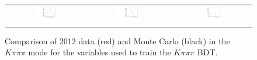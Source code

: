 \begin{figure}
\begin{tabular}{ccc}
\includegraphics[width=0.3\textwidth]{ANA_resources/Plots/Monte_carlo/data_vs_MC/Kpipipi/log10(KstarPi_IPCHI2_OWNPV)_2012.pdf} & \includegraphics[width=0.3\textwidth]{ANA_resources/Plots/Monte_carlo/data_vs_MC/Kpipipi/log10(KstarK_PT)_2012.pdf} & \includegraphics[width=0.3\textwidth]{ANA_resources/Plots/Monte_carlo/data_vs_MC/Kpipipi/log10(KstarPi_PT)_2012.pdf} \\
\end{tabular}
\caption{Comparison of 2012 data (red) and Monte Carlo (black) in the $K\pi\pi\pi$ mode for the variables used to train the $K\pi\pi\pi$ BDT.}
\label{fig:data_vs_MC_Kpipipi_2012}
\end{figure}
